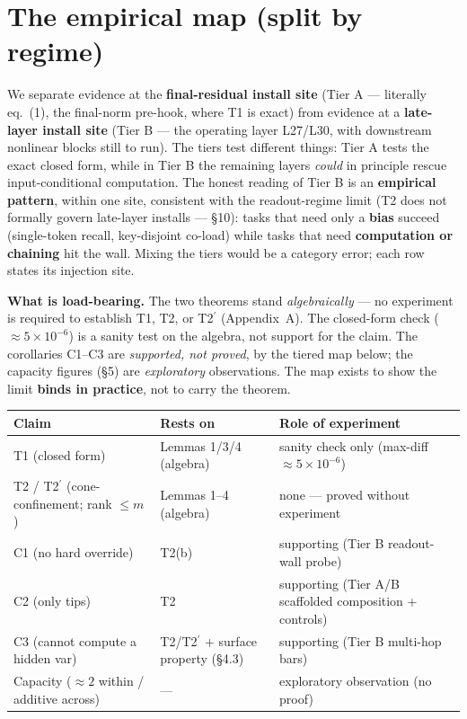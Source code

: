 \documentclass[11pt]{article}
\theoremstyle{plain}
\theoremstyle{definition}
\begin{document}
\section{The empirical map (split by regime)}

We separate evidence at the \textbf{final-residual install site} (Tier A --- literally eq.~(1), the final-norm pre-hook, where T1 is exact) from evidence at a \textbf{late-layer install site} (Tier B --- the operating layer L27/L30, with downstream nonlinear blocks still to run). The tiers test different things: Tier A tests the exact closed form, while in Tier B the remaining layers \emph{could} in principle rescue input-conditional computation. The honest reading of Tier B is an \textbf{empirical pattern}, within one site, consistent with the readout-regime limit (T2 does not formally govern late-layer installs --- \S10): tasks that need only a \textbf{bias} succeed (single-token recall, key-disjoint co-load) while tasks that need \textbf{computation or chaining} hit the wall. Mixing the tiers would be a category error; each row states its injection site.

\textbf{What is load-bearing.} The two theorems stand \emph{algebraically} --- no experiment is required to establish T1, T2, or T2$^{\prime}$ (Appendix~A). The closed-form check ($\approx 5\times10^{-6}$) is a sanity test on the algebra, not support for the claim. The corollaries C1--C3 are \emph{supported, not proved}, by the tiered map below; the capacity figures (\S5) are \emph{exploratory} observations. The map exists to show the limit \textbf{binds in practice}, not to carry the theorem.

\begin{table}[ht]
\centering
\footnotesize
\begin{tabular}{p{4.2cm}p{4.0cm}p{4.0cm}}
\toprule
Claim & Rests on & Role of experiment \\
\midrule
T1 (closed form) & Lemmas 1/3/4 (algebra) & sanity check only (max-diff $\approx 5\times10^{-6}$) \\
T2 / T2$^{\prime}$ (cone-confinement; rank $\le m$) & Lemmas 1--4 (algebra) & none --- proved without experiment \\
C1 (no hard override) & T2(b) & supporting (Tier B readout-wall probe) \\
C2 (only tips) & T2 & supporting (Tier A/B scaffolded composition + controls) \\
C3 (cannot compute a hidden var) & T2/T2$^{\prime}$ + surface property (\S4.3) & supporting (Tier B multi-hop bars) \\
Capacity ($\approx 2$ within / additive across) & --- & exploratory observation (no proof) \\
\bottomrule
\end{tabular}
\end{table}
\end{document}
